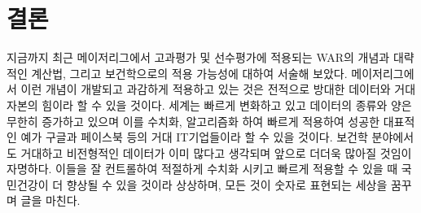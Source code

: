 \documentclass[11pt]{article}
\begin{document}
\section{결론}
지금까지 최근 메이저리그에서 고과평가 및 선수평가에 적용되는 WAR의 개념과 대략적인 계산법, 그리고 보건학으로의 적용 가능성에 대하여 서술해 보았다. 메이저리그에서 이런 개념이 개발되고 과감하게 적용하고 있는 것은 전적으로 방대한 데이터와 거대자본의 힘이라 할 수 있을 것이다. 세계는 빠르게 변화하고 있고 데이터의 종류와 양은 무한히 증가하고 있으며 이를 수치화, 알고리즘화 하여 빠르게 적용하여 성공한 대표적인 예가 구글과 페이스북 등의 거대 IT기업들이라 할 수 있을 것이다. 보건학 분야에서도 거대하고 비전형적인 데이터가 이미 많다고 생각되며 앞으로 더더욱 많아질 것임이 자명하다. 이들을 잘 컨트롤하여 적절하게 수치화 시키고 빠르게 적용할 수 있을 때 국민건강이 더 향상될 수 있을 것이라 상상하며, 모든 것이 숫자로 표현되는 세상을 꿈꾸며 글을 마친다.  


\end{document}
